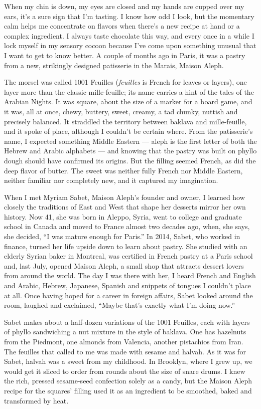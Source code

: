 When my chin is down, my eyes are closed and my hands are cupped over my
ears, it's a sure sign that I'm tasting. I know how odd I look, but the
momentary calm helps me concentrate on flavors when there's a new recipe
at hand or a complex ingredient. I always taste chocolate this way, and
every once in a while I lock myself in my sensory cocoon because I've
come upon something unusual that I want to get to know better. A couple
of months ago in Paris, it was a pastry from a new, strikingly designed
patisserie in the Marais, Maison Aleph.

The morsel was called 1001 Feuilles (\emph{feuilles} is French for
leaves or layers), one layer more than the classic mille-feuille; its
name carries a hint of the tales of the Arabian Nights. It was square,
about the size of a marker for a board game, and it was, all at once,
chewy, buttery, sweet, creamy, a tad chunky, nuttish and precisely
balanced. It straddled the territory between baklava and mille-feuille,
and it spoke of place, although I couldn't be certain where. From the
patisserie's name, I expected something Middle Eastern --- aleph is the
first letter of both the Hebrew and Arabic alphabets --- and knowing
that the pastry was built on phyllo dough should have confirmed its
origins. But the filling seemed French, as did the deep flavor of
butter. The sweet was neither fully French nor Middle Eastern, neither
familiar nor completely new, and it captured my imagination.

When I met Myriam Sabet, Maison Aleph's founder and owner, I learned how
closely the traditions of East and West that shape her desserts mirror
her own history. Now 41, she was born in Aleppo, Syria, went to college
and graduate school in Canada and moved to France almost two decades
ago, when, she says, she decided, ``I was mature enough for Paris.'' In
2014, Sabet, who worked in finance, turned her life upside down to learn
about pastry. She studied with an elderly Syrian baker in Montreal, was
certified in French pastry at a Paris school and, last July, opened
Maison Aleph, a small shop that attracts dessert lovers from around the
world. The day I was there with her, I heard French and English and
Arabic, Hebrew, Japanese, Spanish and snippets of tongues I couldn't
place at all. Once having hoped for a career in foreign affairs, Sabet
looked around the room, laughed and exclaimed, ``Maybe that's exactly
what I'm doing now.''

Sabet makes about a half-dozen variations of the 1001 Feuilles, each
with layers of phyllo sandwiching a nut mixture in the style of baklava.
One has hazelnuts from the Piedmont, one almonds from Valencia, another
pistachios from Iran. The feuilles that called to me was made with
sesame and halvah. As it was for Sabet, halvah was a sweet from my
childhood. In Brooklyn, where I grew up, we would get it sliced to order
from rounds about the size of snare drums. I knew the rich, pressed
sesame-seed confection solely as a candy, but the Maison Aleph recipe
for the squares' filling used it as an ingredient to be smoothed, baked
and transformed by heat.

